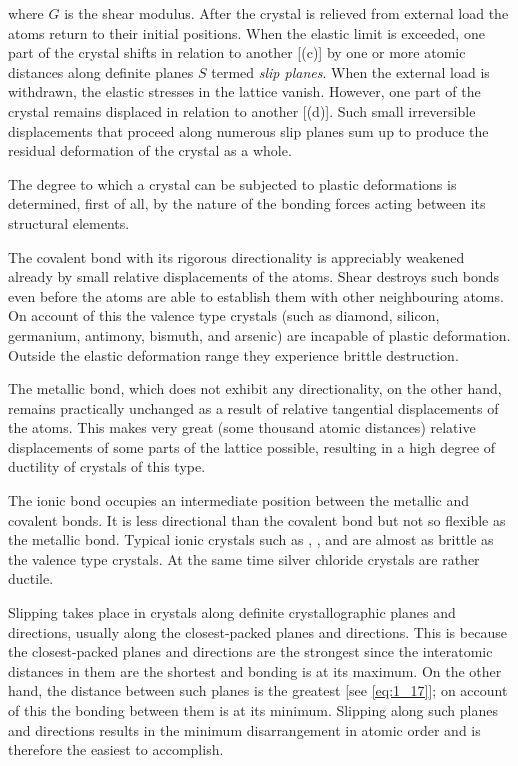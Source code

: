 \noindent
where $G$ is the shear modulus. After the crystal is relieved from external load the atoms return to their initial positions. When the elastic limit is exceeded, one part of the crystal shifts in relation to another [(c)] by one or more atomic distances along definite planes $S$ termed \textit{slip planes}. When the external load is withdrawn, the elastic stresses in the lattice vanish. However, one part of the crystal remains displaced in relation to another [(d)]. Such small irreversible displacements that proceed along numerous slip planes sum up to produce the residual deformation of the crystal as a whole.

The degree to which a crystal can be subjected to plastic deformations is determined, first of all, by the nature of the bonding forces acting between its structural elements.

The covalent bond with its rigorous directionality is appreciably weakened already by small relative displacements of the atoms. Shear destroys such bonds even before the atoms are able to establish them with other neighbouring atoms. On account of this the valence type crystals (such as diamond, silicon, germanium, antimony, bismuth, and arsenic) are incapable of plastic deformation. Outside the elastic deformation range they experience brittle destruction.

The metallic bond, which does not exhibit any directionality, on the other hand, remains practically unchanged as a result of relative tangential displacements of the atoms. This makes very great (some thousand atomic distances) relative displacements of some parts of the lattice possible, resulting in a high degree of ductility of crystals of this type.

The ionic bond occupies an intermediate position between the metallic and covalent bonds. It is less directional than the covalent bond but not so flexible as the metallic bond. Typical ionic crystals such as , , and  are almost as brittle as the valence type crystals. At the same time silver chloride crystals are rather ductile.

Slipping takes place in crystals along definite crystallographic planes and directions, usually along the closest-packed planes and directions. This is because the closest-packed planes and directions are the strongest since the interatomic distances in them are the shortest and bonding is at its maximum. On the other hand, the distance between such planes is the greatest [see \eqref{eq:1_17}]; on account of this the bonding between them is at its minimum. Slipping along such planes and directions results in the minimum disarrangement in atomic order and is therefore the easiest to accomplish.

